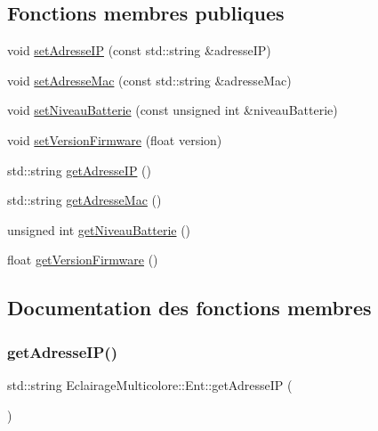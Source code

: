 \subsection*{Fonctions membres publiques}
\begin{DoxyCompactItemize}
\item 
void \hyperlink{classEclairageMulticolore_1_1Ent_af7d67d8332c642aed4cc4b4ed3d28a22}{set\+Adresse\+IP} (const std\+::string \&adresse\+IP)
\item 
void \hyperlink{classEclairageMulticolore_1_1Ent_a5c6a220619c1918a4f7d0b055a9c62d8}{set\+Adresse\+Mac} (const std\+::string \&adresse\+Mac)
\item 
void \hyperlink{classEclairageMulticolore_1_1Ent_ae27a0476fd11a1038a5dad51ec4b1174}{set\+Niveau\+Batterie} (const unsigned int \&niveau\+Batterie)
\item 
void \hyperlink{classEclairageMulticolore_1_1Ent_a8d4b24f6283dad3d1eebd990c32500df}{set\+Version\+Firmware} (float version)
\item 
std\+::string \hyperlink{classEclairageMulticolore_1_1Ent_ab94fe4fea3e833da751893b042b58c72}{get\+Adresse\+IP} ()
\item 
std\+::string \hyperlink{classEclairageMulticolore_1_1Ent_ae507ad469e0e50b258d949e86e7fc964}{get\+Adresse\+Mac} ()
\item 
unsigned int \hyperlink{classEclairageMulticolore_1_1Ent_ace38da1ad4db26da09187eb9057aa814}{get\+Niveau\+Batterie} ()
\item 
float \hyperlink{classEclairageMulticolore_1_1Ent_a1d3deebf88fdd71633bc92219a070ce1}{get\+Version\+Firmware} ()
\end{DoxyCompactItemize}


\subsection{Documentation des fonctions membres}
\mbox{\label{classEclairageMulticolore_1_1Ent_ab94fe4fea3e833da751893b042b58c72}} 
\subsubsection{\texorpdfstring{get\+Adresse\+I\+P()}{getAdresseIP()}}
{\footnotesize\ttfamily std\+::string Eclairage\+Multicolore\+::\+Ent\+::get\+Adresse\+IP (\begin{DoxyParamCaption}{ }\end{DoxyParamCaption})}

